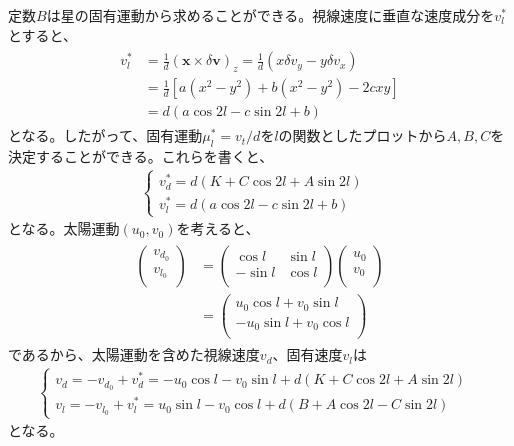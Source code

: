 定数$B$は星の固有運動から求めることができる。視線速度に垂直な速度成分を$v^*_l$とすると、
\begin{align}
\begin{aligned}
	v^*_l &= \frac{1}{d}({\bm x} \times \delta{\bm v})_z = \frac{1}{d}(x\delta v_y - y\delta v_x)\\
	&= \frac{1}{d}[a(x^2 - y^2) + b(x^2 - y^2) - 2cxy] \\
	&= d(a\cos2l - c \sin2l + b)
\end{aligned}
\end{align}
となる。したがって、固有運動$\mu^*_l = v_t/d$を$l$の関数としたプロットから$A, B, C$を決定することができる。これらを書くと、
\begin{align}
\begin{cases}
	v^*_d = d(K + C\cos2l + A\sin2l) & \\
	v^*_l = d(a\cos2l - c \sin2l + b) &
\end{cases}
\end{align}
となる。太陽運動$(u_0,v_0)$を考えると、
\begin{align}
\begin{aligned}
	\left(
	\begin{array}{c}
	 	v_{d_0}\\
		v_{l_0}\\
	\end{array}
	\right)
	&=
	\left(
	\begin{array}{cc}
	 	\cos l & \sin l\\
		-\sin l & \cos l\\
	\end{array}
	\right)
	\left(
	\begin{array}{c}
	 	u_0\\
		v_0\\
	\end{array}
	\right) \\
	&=
	\left(
	\begin{array}{c}
	 	u_0 \cos l + v_0 \sin l\\
		-u_0 \sin l + v_0 \cos l\\
	\end{array}
	\right)
\end{aligned}
\end{align}
であるから、太陽運動を含めた視線速度$v_d$、固有速度$v_l$は
\begin{align}
\begin{cases}
	v_d = -v_{d_0} + v^*_d = -u_0 \cos l - v_0 \sin l + d(K + C \cos 2l + A \sin 2l) &\\
	v_l = -v_{l_0} + v^*_l = u_0 \sin l - v_0 \cos l + d(B + A \cos 2l - C \sin 2l) & 
\end{cases}
\end{align}
となる。

